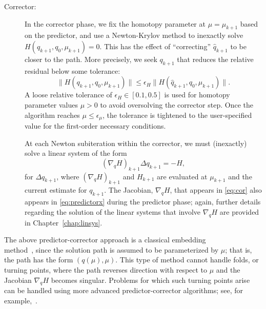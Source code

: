 \begin{description}
  \item[Corrector:] In the corrector phase, we fix the homotopy parameter
    at $\mu=\mu_{k+1}$ based on the predictor, and use a Newton-Krylov method to
    inexactly solve $H(q_{k+1},q_0,\mu_{k+1}) = 0$.  This has the effect of
    ``correcting'' $\hat{q}_{k+1}$ to be closer to the path.  More precisely,
    we seek $q_{k+1}$ that reduces the relative residual below some tolerance:
    \begin{equation}\label{eq:cornt}
      \lVert H(q_{k+1},q_0,\mu_{k+1}) \rVert \leq
      \epsilon_H \lVert H(\hat{q}_{k+1},q_0,\mu_{k+1}) \rVert.
    \end{equation}
    A loose relative tolerance of $\epsilon_H \in [0.1,0.5]$ is used for
    homotopy parameter values $\mu > 0$ to avoid oversolving the corrector step.
    Once the algorithm reaches $\mu \leq \epsilon_\mu$, the tolerance is tightened to the
    user-specified value for the first-order necessary conditions.
    
    At each Newton subiteration within the corrector, we must (inexactly) solve a linear
    system of the form
    \begin{equation}\label{eq:cor}
      \left(\nabla_q H \right)_{k+1} \Delta q_{k+1} = -H,
    \end{equation}
    for $\Delta q_{k+1}$, where $(\nabla_q H)_{k+1}$ and $H_{k+1}$ are evaluated
    at $\mu_{k+1}$ and the current estimate for $q_{k+1}$.  The Jacobian,
    $\nabla_q H$, that appears in \eqref{eq:cor} also appears in
    \eqref{eq:predictorx} during the predictor phase; again, further details
    regarding the solution of the linear systems that involve $\nabla_q H$ are
    provided in Chapter~\ref{chap:linsys}.

\end{description}

\begin{remark}
  The above predictor-corrector approach is a classical  embedding \\
  method~\cite{allgower_georg_1993}, since the solution path is assumed to be
  parameterized by $\mu$; that is, the path has the form $(q(\mu),\mu)$.  This
  type of method cannot handle folds, or turning points, where the path reverses
  direction with respect to $\mu$ and the Jacobian $\nabla_q H$ becomes
  singular.  Problems for which such turning points arise can be handled using
  more advanced predictor-corrector algorithms; see, for
  example,~\cite{walker:1999}.
\end{remark}


